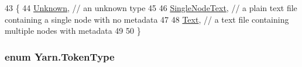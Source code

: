 \begin{DoxyCode}
43     \{
44         \hyperlink{a00048_ad7ebb46e7309ead8767383a672b3272fa88183b946cc5f0e8c96b2e66e1c74a7e}{Unknown}, \textcolor{comment}{// an unknown type}
45 
46         \hyperlink{a00048_ad7ebb46e7309ead8767383a672b3272faceeb33da53902872b63956f8df786cd8}{SingleNodeText}, \textcolor{comment}{// a plain text file containing a single node with no metadata}
47 
48         \hyperlink{a00048_a301aa7c866593a5b625a8fc158bbeacea9dffbf69ffba8bc38bc4e01abf4b1675}{Text}, \textcolor{comment}{//  a text file containing multiple nodes with metadata}
49 
50     \}
\end{DoxyCode}
\hypertarget{a00048_a301aa7c866593a5b625a8fc158bbeace}{
\subsubsection[{Token\-Type}]{\setlength{\rightskip}{0pt plus 5cm}enum {\bf Yarn.\-Token\-Type}\hspace{0.3cm}{\ttfamily [package]}}}\label{a00048_a301aa7c866593a5b625a8fc158bbeace}
